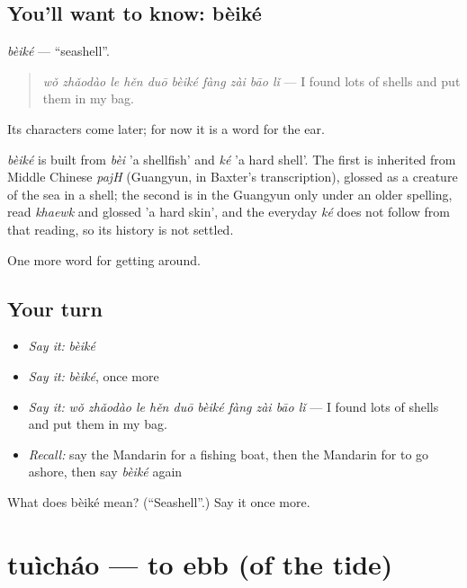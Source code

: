 \subsection*{You'll want to know: bèiké}
\emph{bèiké} — \textquotedblleft{}seashell\textquotedblright{}.

\begin{quote}
\emph{wǒ zhǎodào le hěn duō bèiké fàng zài bāo lǐ} — I found lots of shells and put them in my bag.
\end{quote}

Its characters come later; for now it is a word for the ear.

\begin{cousinweb}
\emph{bèiké} is built from \emph{bèi} 'a shellfish' and \emph{ké} 'a hard shell'. The first is inherited from Middle Chinese \emph{pajH} (Guangyun, in Baxter's transcription), glossed as a creature of the sea in a shell; the second is in the Guangyun only under an older spelling, read \emph{khaewk} and glossed 'a hard skin', and the everyday \emph{ké} does not follow from that reading, so its history is not settled.
\end{cousinweb}

\begin{grammarlens}[title={What you've built}]
One more word for getting around.
\end{grammarlens}

\subsection*{Your turn}
\begin{itemize}
\raggedright
  \item \emph{Say it:} \emph{bèiké}
  \item \emph{Say it:} \emph{bèiké}, once more
  \item \emph{Say it:} \emph{wǒ zhǎodào le hěn duō bèiké fàng zài bāo lǐ} — I found lots of shells and put them in my bag.
  \item \emph{Recall:} say the Mandarin for a fishing boat, then the Mandarin for to go ashore, then say \emph{bèiké} again
\end{itemize}

\begin{tcolorbox}[breakable,colback=teal!4,colframe=teal!35!black,title={Before you move on}]
What does bèiké mean? (\textquotedblleft{}Seashell\textquotedblright{}.) Say it once more.
\end{tcolorbox}
\section[tuìcháo]{tuìcháo — to ebb (of the tide)}

